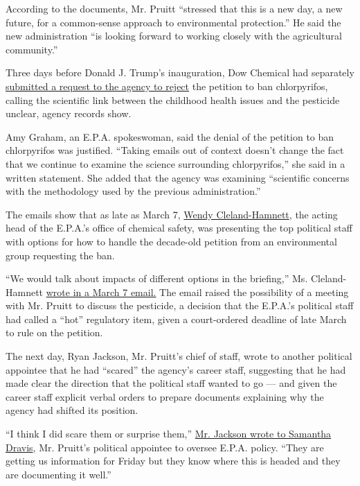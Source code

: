 According to the documents, Mr. Pruitt ``stressed that this is a new
day, a new future, for a common-sense approach to environmental
protection.'' He said the new administration ``is looking forward to
working closely with the agricultural community.''

Three days before Donald J. Trump's inauguration, Dow Chemical had
separately
\href{https://www.documentcloud.org/documents/3935257-2017-1-17-Dow-Comments-on-Pesticide-Ban-Urging.html}{submitted
a request to the agency to reject} the petition to ban chlorpyrifos,
calling the scientific link between the childhood health issues and the
pesticide unclear, agency records show.

Amy Graham, an E.P.A. spokeswoman, said the denial of the petition to
ban chlorpyrifos was justified. ``Taking emails out of context doesn't
change the fact that we continue to examine the science surrounding
chlorpyrifos,'' she said in a written statement. She added that the
agency was examining ``scientific concerns with the methodology used by
the previous administration.''

The emails show that as late as March 7,
\href{https://www.epa.gov/aboutepa/about-office-chemical-safety-and-pollution-prevention-ocspp}{Wendy
Cleland-Hamnett}, the acting head of the E.P.A.'s office of chemical
safety, was presenting the top political staff with options for how to
handle the decade-old petition from an environmental group requesting
the ban.

``We would talk about impacts of different options in the briefing,''
Ms. Cleland-Hamnett
\href{https://www.documentcloud.org/documents/3935290-EPA-HQ-2017-005731-Redacted.html\#document/p228/a369116}{wrote
in a March 7 email.} The email raised the possibility of a meeting with
Mr. Pruitt to discuss the pesticide, a decision that the E.P.A.'s
political staff had called a ``hot'' regulatory item, given a
court-ordered deadline of late March to rule on the petition.

The next day, Ryan Jackson, Mr. Pruitt's chief of staff, wrote to
another political appointee that he had ``scared'' the agency's career
staff, suggesting that he had made clear the direction that the
political staff wanted to go --- and given the career staff explicit
verbal orders to prepare documents explaining why the agency had shifted
its position.

``I think I did scare them or surprise them,''
\href{https://www.documentcloud.org/documents/3935290-EPA-HQ-2017-005731-Redacted.html\#document/p530/a369101}{Mr.
Jackson wrote to Samantha Dravis}, Mr. Pruitt's political appointee to
oversee E.P.A. policy. ``They are getting us information for Friday but
they know where this is headed and they are documenting it well.''


